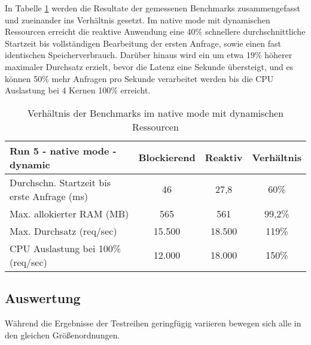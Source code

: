 In Tabelle \ref{table:dynamic_native_measurement_results} werden die Resultate der gemessenen Benchmarks zusammengefasst
und zueinander ins Verhältnis gesetzt. Im native mode mit dynamischen Ressourcen erreicht die reaktive Anwendung
eine 40\% schnellere durchschnittliche Startzeit bis vollständigen Bearbeitung der ersten Anfrage, sowie einen fast identischen
Speicherverbrauch.
Darüber hinaus wird ein um etwa 19\% höherer maximaler Durchsatz erzielt, bevor die Latenz eine Sekunde übersteigt, und
es können 50\% mehr Anfragen pro Sekunde verarbeitet werden bis die CPU Auslastung bei 4 Kernen 100\% erreicht.

\begin{table}[ht!]
    \begin{tabular}{|l | c | c | c|}
        \hline
        Run 5 - native mode - dynamic & Blockierend & Reaktiv & Verhältnis \\
        \hline
        \makecell[l]{Durchschn. Startzeit bis                              \\erste Anfrage (ms)} &   46    &  27,8 &   60\%   \\
        \hline
        Max. allokierter RAM (MB)     & 565         & 561     & 99,2\%     \\
        \hline
        Max. Durchsatz (req/sec)      & 15.500      & 18.500  & 119\%      \\
        \hline
        \makecell[l]{CPU Auslastung bei 100\%                              \\(req/sec)} & 12.000 & 18.000 & 150\%  \\
        \hline
    \end{tabular}
    \caption{Verhältnis der Benchmarks im native mode mit dynamischen Ressourcen}
    \label{table:dynamic_native_measurement_results}
\end{table}

\subsection{Auswertung}
\label{subsubsec:auswertung}
Während die Ergebnisse der Testreihen geringfügig variieren bewegen sich alle in den gleichen Größenordnungen.

